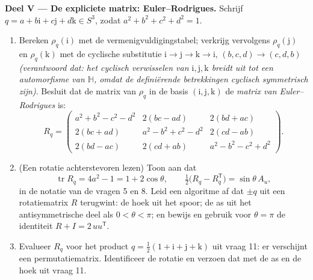 \begin{problem}
\medskip
\noindent\textbf{Deel V --- De expliciete matrix:
Euler--Rodrigues.} Schrijf $q = a + b\mathrm i + c\mathrm j +
d\mathrm k \in S^3$, zodat $a^2 + b^2 + c^2 + d^2 = 1$.
\begin{enumerate}[resume]
  \item Bereken $\rho_q(\mathrm i)$  met de
        vermenigvuldigingstabel; verkrijg vervolgens
        $\rho_q(\mathrm j)$ en $\rho_q(\mathrm k)$ met de
        cyclische substitutie $\mathrm i \to \mathrm j \to
        \mathrm k \to \mathrm i$, $(b, c, d) \to (c, d, b)$
        \emph{(verantwoord dat: het cyclisch verwisselen van
        $\mathrm i, \mathrm j, \mathrm k$ breidt uit tot een
        automorfisme van $\mathbb H$, omdat de definiërende
        betrekkingen cyclisch symmetrisch zijn)}. Besluit dat de
        matrix van $\rho_q$ in de basis $(\mathrm i, \mathrm j,
        \mathrm k)$ de \emph{matrix van Euler--Rodrigues} is:
        \[
        R_q = \begin{pmatrix}
        a^2 + b^2 - c^2 - d^2 & 2(bc - ad) & 2(bd + ac)\\
        2(bc + ad) & a^2 - b^2 + c^2 - d^2 & 2(cd - ab)\\
        2(bd - ac) & 2(cd + ab) & a^2 - b^2 - c^2 + d^2
        \end{pmatrix}.
        \]
  \item (Een rotatie achterstevoren lezen) Toon aan dat
        \[
        \operatorname{tr}R_q = 4a^2 - 1 = 1 + 2\cos\theta,
        \qquad
        \tfrac12\bigl(R_q - R_q^{\mathsf T}\bigr) =
        \sin\theta\,A_u,
        \]
        in de notatie van de vragen 5 en 8. Leid een algoritme af
        dat $\pm q$ uit een rotatiematrix $R$ terugwint: de hoek
        uit het spoor; de as uit het antisymmetrische deel als $0
        < \theta < \pi$; en bewijs en gebruik voor $\theta = \pi$
        de identiteit $R + I = 2\,uu^{\mathsf T}$.
  \item Evalueer $R_q$ voor het product $q = \frac12(1 + \mathrm
        i + \mathrm j + \mathrm k)$ uit vraag 11: er verschijnt
        een permutatiematrix. Identificeer de rotatie en verzoen
        dat met de as en de hoek uit vraag 11.
\end{enumerate}


\end{problem}
